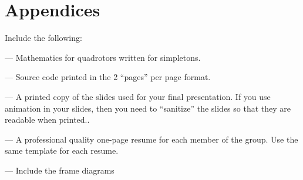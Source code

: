 \documentclass{article}
\numberwithin{equation}{section} %
\begin{document}
\section{Appendices}
 Include the following:

 --- Mathematics for quadrotors written for simpletons.
 
 --- Source code printed in the 2 “pages” per page format.
 
 --- A printed copy of the slides used for your final presentation. If you use animation in your slides, then you need to “sanitize” the slides so that they are readable when printed..
 
 --- A professional quality one-page resume for each member of the group. Use the same template for each resume.
 
 --- Include the frame diagrams
\end{document}
